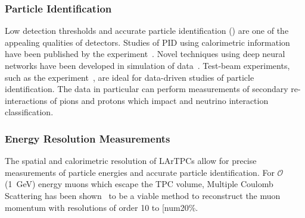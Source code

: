 \subsubsection{Particle Identification}
Low detection thresholds and accurate particle identification () are one of the appealing qualities of  detectors. Studies of PID using calorimetric information have been published by the \argoneut experiment~\cite{bib:ARGONEUTrecomb}. Novel techniques using deep neural networks have been developed in simulation of  data~\cite{bib:uB_DL}. Test-beam experiments, such as the \lariat experiment~\cite{bib:LArIAT}, are ideal for data-driven studies of particle identification. The \lariat data in particular can perform measurements of secondary re-interactions of pions and protons which impact  and neutrino interaction classification.

\subsubsection{Energy Resolution Measurements}
The spatial and calorimetric resolution of LArTPCs allow for precise measurements of particle energies and accurate particle identification. For $\mathcal{O}$(\SI{1}{\GeV}) energy muons which escape the TPC volume, Multiple Coulomb Scattering has been shown~\cite{bib:ICARUS_MCS_1,bib:ICARUS_MCS_2,bib:uB_MCS} to be a viable method to reconstruct the muon momentum with resolutions of order \num{10} to [num{20}\%. 


